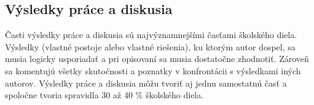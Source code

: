 \subsection{Výsledky práce a diskusia}
Časti výsledky práce a diskusia sú najvýznamnejšími  časťami  školského diela. 
Výsledky (vlastné postoje alebo vlastné riešenia), ku ktorým autor dospel, sa musia 
logicky usporiadať a pri opisovaní sa musia dostatočne zhodnotiť. Zároveň sa 
komentujú všetky skutočnosti a poznatky v konfrontácii s výsledkami iných autorov. 
Výsledky práce a diskusia môžu tvoriť aj jednu samostatnú časť  a spoločne tvoria 
spravidla 30 až 40 \% školského diela.  
